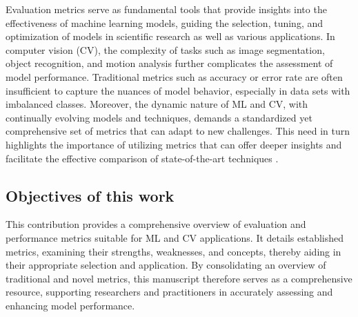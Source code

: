 \documentclass{article}
\begin{document}
Evaluation metrics serve as fundamental tools that provide insights into the effectiveness of machine learning models, guiding the selection, tuning, and optimization of models in scientific research as well as various applications. In computer vision (CV), the complexity of tasks such as image segmentation, object recognition, and motion analysis further complicates the assessment of model performance. Traditional metrics such as accuracy or error rate are often insufficient to capture the nuances of model behavior, especially in data sets with imbalanced classes. Moreover, the dynamic nature of ML and CV, with continually evolving models and techniques, demands a standardized yet comprehensive set of metrics that can adapt to new challenges. This need in turn highlights the importance of utilizing metrics that can offer deeper insights and facilitate the effective comparison of state-of-the-art techniques \cite{ferri2009experimental}.


\subsection{Objectives of this work}

This contribution provides a comprehensive overview of evaluation and performance metrics suitable for ML and CV applications. It details established metrics, examining their strengths, weaknesses, and concepts, thereby aiding in their appropriate selection and application. By consolidating an overview of traditional and novel metrics, this manuscript therefore serves as a comprehensive resource, supporting researchers and practitioners in accurately assessing and enhancing model performance.
\end{document}
